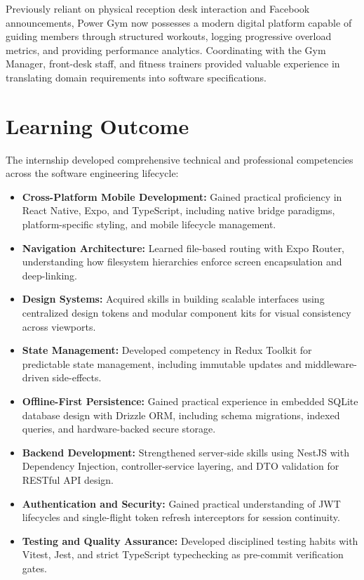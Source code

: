 Previously reliant on physical reception desk interaction and Facebook announcements, Power Gym now possesses a modern digital platform capable of guiding members through structured workouts, logging progressive overload metrics, and providing performance analytics. Coordinating with the Gym Manager, front-desk staff, and fitness trainers provided valuable experience in translating domain requirements into software specifications.

\section{Learning Outcome}
The internship developed comprehensive technical and professional competencies across the software engineering lifecycle:

\begin{itemize}
    \item \textbf{Cross-Platform Mobile Development:} Gained practical proficiency in React Native, Expo, and TypeScript, including native bridge paradigms, platform-specific styling, and mobile lifecycle management.
    \item \textbf{Navigation Architecture:} Learned file-based routing with Expo Router, understanding how filesystem hierarchies enforce screen encapsulation and deep-linking.
    \item \textbf{Design Systems:} Acquired skills in building scalable interfaces using centralized design tokens and modular component kits for visual consistency across viewports.
    \item \textbf{State Management:} Developed competency in Redux Toolkit for predictable state management, including immutable updates and middleware-driven side-effects.
    \item \textbf{Offline-First Persistence:} Gained practical experience in embedded SQLite database design with Drizzle ORM, including schema migrations, indexed queries, and hardware-backed secure storage.
    \item \textbf{Backend Development:} Strengthened server-side skills using NestJS with Dependency Injection, controller-service layering, and DTO validation for RESTful API design.
    \item \textbf{Authentication and Security:} Gained practical understanding of JWT lifecycles and single-flight token refresh interceptors for session continuity.
    \item \textbf{Testing and Quality Assurance:} Developed disciplined testing habits with Vitest, Jest, and strict TypeScript typechecking as pre-commit verification gates.
\end{itemize}

